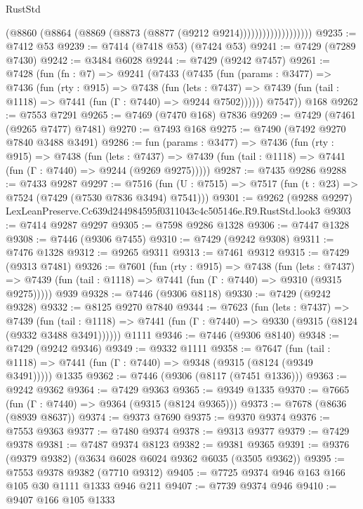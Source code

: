 \begin{lexlean}{RustStd}
\begin{coremodule}
                              (@8860 (@8864 (@8869 (@8873 (@8877 (@9212 @9214)))))))))))))))))))
@9235 := @7412 @53
@9239 := @7414 (@7418 @53) (@7424 @53)
@9241 := @7429 (@7289 @7430)
@9242 := @3484 @6028
@9244 := @7429 (@9242 @7457)
@9261 := @7428
    (fun (fn : @7) =>
    @9241
      (@7433
        (@7435
          (fun (params : @3477) =>
          @7436
            (fun (rty : @915) =>
            @7438
              (fun (lets : @7437) =>
              @7439 (fun (tail : @1118) => @7441 (fun (Γ : @7440) => @9244 @7502))))))
        @7547))
    @168
@9262 := @7553 @7291
@9265 := @7469 (@7470 @168) @7836
@9269 := @7429 (@7461 (@9265 @7477) @7481)
@9270 := @7493 @168
@9275 := @7490 (@7492 @9270 @7840 @3488 @3491)
@9286 := fun (params : @3477) =>
  @7436
    (fun (rty : @915) =>
    @7438
      (fun (lets : @7437) =>
      @7439 (fun (tail : @1118) => @7441 (fun (Γ : @7440) => @9244 (@9269 @9275)))))
@9287 := @7435 @9286
@9288 := @7433 @9287
@9297 := @7516 (fun (U : @7515) => @7517 (fun (t : @23) => @7524 (@7429 (@7530 @7836 @3494) @7541)))
@9301 := @9262 (@9288 @9297) LexLeanPreserve.Cc639d244984595f0311043c4c505146e.R9.RustStd.look3
@9303 := @7414 @9287 @9297
@9305 := @7598 @9286 @1328
@9306 := @7447 @1328
@9308 := @7446 (@9306 @7455)
@9310 := @7429 (@9242 @9308)
@9311 := @7476 @1328
@9312 := @9265 @9311
@9313 := @7461 @9312
@9315 := @7429 (@9313 @7481)
@9326 := @7601
    (fun (rty : @915) =>
    @7438
      (fun (lets : @7437) =>
      @7439 (fun (tail : @1118) => @7441 (fun (Γ : @7440) => @9310 (@9315 @9275)))))
    @939
@9328 := @7446 (@9306 @8118)
@9330 := @7429 (@9242 @9328)
@9332 := @8125 @9270 @7840
@9344 := @7623
    (fun (lets : @7437) =>
    @7439
      (fun (tail : @1118) => @7441 (fun (Γ : @7440) => @9330 (@9315 (@8124 (@9332 @3488 @3491))))))
    @1111
@9346 := @7446 (@9306 @8140)
@9348 := @7429 (@9242 @9346)
@9349 := @9332 @1111
@9358 := @7647
    (fun (tail : @1118) => @7441 (fun (Γ : @7440) => @9348 (@9315 (@8124 (@9349 @3491)))))
    @1335
@9362 := @7446 (@9306 (@8117 (@7451 @1336)))
@9363 := @9242 @9362
@9364 := @7429 @9363
@9365 := @9349 @1335
@9370 := @7665 (fun (Γ : @7440) => @9364 (@9315 (@8124 @9365)))
@9373 := @7678 (@8636 (@8939 @8637))
@9374 := @9373 @7690
@9375 := @9370 @9374
@9376 := @7553 @9363
@9377 := @7480 @9374
@9378 := @9313 @9377
@9379 := @7429 @9378
@9381 := @7487 @9374 @8123
@9382 := @9381 @9365
@9391 := @9376 (@9379 @9382) (@3634 @6028 @6024 @9362 @6035 (@3505 @9362))
@9395 := @7553 @9378 @9382 (@7710 @9312)
@9405 := @7725 @9374 @946 @163 @166 @105 @30 @1111 @1333 @946 @211
@9407 := @7739 @9374 @946
@9410 := @9407 @166 @105 @1333

\end{coremodule}
\end{lexlean}

